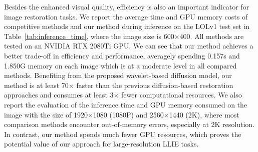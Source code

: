 Besides the enhanced visual quality, efficiency is also an important indicator for image restoration tasks. We report the average time and GPU memory costs of competitive methods and our method during inference on the LOLv1 test set in Table~\ref{tab:inference_time}, where the image size is 600$\times$400. All methods are tested on an NVIDIA RTX 2080Ti GPU. We can see that our method achieves a better trade-off in efficiency and performance, averagely spending 0.157s and 1.850G memory on each image which is at a moderate level in all compared methods. Benefiting from the proposed wavelet-based diffusion model, our method is at least 70$\times$ faster than the previous diffusion-based restoration approaches and consumes at least 3$\times$ fewer computational resources. We also report the evaluation of the inference time and GPU memory consumed on the image with the size of 1920$\times$1080 (1080P) and 2560$\times$1440 (2K), where most comparison methods encounter out-of-memory errors, especially at 2K resolution. In contrast, our method spends much fewer GPU resources, which proves the potential value of our approach for large-resolution LLIE tasks.
